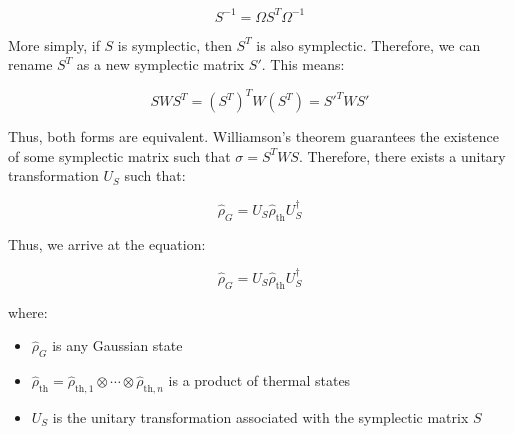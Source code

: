 \begin{equation}
    S^{-1} = \Omega S^T \Omega^{-1}
\end{equation}

More simply, if $S$ is symplectic, then $S^T$ is also symplectic. Therefore, we can rename $S^T$ as a new symplectic matrix $S'$. This means:

\begin{equation}
    S W S^T = (S^T)^T W (S^T) = S'^T W S'
\end{equation}

Thus, both forms are equivalent. Williamson's theorem guarantees the existence of some symplectic matrix such that $\sigma = S^T W S$. Therefore, there exists a unitary transformation $U_S$ such that:

\begin{equation}
    \hat{\rho}_G = U_S \hat{\rho}_{\text{th}} U_S^\dagger
\end{equation}

Thus, we arrive at the equation:

\begin{equation}
    \hat{\rho}_G = U_S \hat{\rho}_{\text{th}} U_S^\dagger
\end{equation}

where:
\begin{itemize}
    \item $\hat{\rho}_G$ is any Gaussian state
    \item $\hat{\rho}_{\text{th}} = \hat{\rho}_{\text{th},1} \otimes \cdots \otimes \hat{\rho}_{\text{th},n}$ is a product of thermal states
    \item $U_S$ is the unitary transformation associated with the symplectic matrix $S$
\end{itemize}
